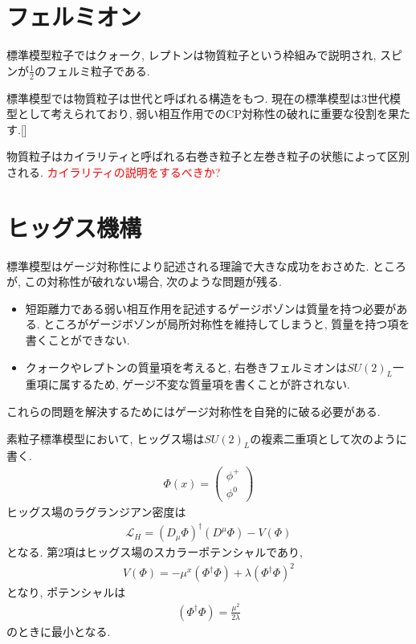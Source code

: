 \section{フェルミオン}
標準模型粒子ではクォーク, レプトンは物質粒子という枠組みで説明され, スピンが$\frac{1}{2}$のフェルミ粒子である.

標準模型では物質粒子は世代と呼ばれる構造をもつ.
現在の標準模型は3世代模型として考えられており, 弱い相互作用でのCP対称性の破れに重要な役割を果たす.[]

物質粒子はカイラリティと呼ばれる右巻き粒子と左巻き粒子の状態によって区別される.
\textcolor{red}{カイラリティの説明をするべきか?}
\section{ヒッグス機構}
標準模型はゲージ対称性により記述される理論で大きな成功をおさめた.
ところが, この対称性が破れない場合, 次のような問題が残る.
\begin{itemize}
  \item 短距離力である弱い相互作用を記述するゲージボゾンは質量を持つ必要がある. ところがゲージボゾンが局所対称性を維持してしまうと, 質量を持つ項を書くことができない.
  \item クォークやレプトンの質量項を考えると, 右巻きフェルミオンは$SU(2)_L$一重項に属するため, ゲージ不変な質量項を書くことが許されない.
\end{itemize}
これらの問題を解決するためにはゲージ対称性を自発的に破る必要がある.

素粒子標準模型において, ヒッグス場は$SU(2)_L$の複素二重項として次のように書く.
\begin{align}
  \Phi(x) = \left(
  \begin{array}{c}
    \phi^+ \\
    \phi^0
  \end{array}
  \right)
\end{align}
ヒッグス場のラグランジアン密度は
\begin{align}
  \mathcal{L}_H = \left(D_\mu \Phi\right)^\dagger (D^\mu \Phi) -V(\Phi) \label{L_H}
\end{align}
となる.
第2項はヒッグス場のスカラーポテンシャルであり,
\begin{align}
  V(\Phi) = -\mu^x (\Phi^\dagger\Phi)+ {\lambda}(\Phi^\dagger \Phi)^2\label{V_H}
\end{align}
となり, ポテンシャルは
\begin{align}
  (\Phi^\dagger \Phi) = \frac{\mu^2}{2\lambda}\nonumber
\end{align}
のときに最小となる.

